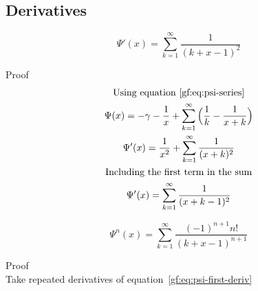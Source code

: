 \documentclass[a4paper]{article}
\begin{document}
    \subsection{Derivatives}\label{gf:subsec:derivatives}
    \begin{theorem}
        \begin{equation}
            \label{gf:eq:psi-first-deriv}
            \boxed{
                \Psi'(x) = \sum_{k=1}^{\infty} \frac{1}{(k+x-1)^2}
            }
        \end{equation}

        Proof
        \\
        \begin{gather*}
            \text{Using equation~\ref{gf:eq:psi-series}}
            \\
            \Psi(x) = -\gamma - \frac{1}{x} + \sum_{k=1}^{\infty} \Big( \frac{1}{k} - \frac{1}{x+k}  \Big)
            \\
            \Psi'(x) = \frac{1}{x^2} + \sum_{k=1}^{\infty} \frac{1}{(x+k)^2}
            \\
            \text{Including the first term in the sum}
            \\
            \Psi'(x) = \sum_{k=1}^{\infty} \frac{1}{(x+k - 1)^2}
        \end{gather*}
    \end{theorem}

    \begin{theorem}
        \begin{equation}
            \label{gf:eq:psi-nth-deriv}
            \boxed{
                \Psi^{n}(x) = \sum_{k=1}^{\infty} \frac{(-1)^{n+1} n! }{(k+x-1)^{n+1}}
            }
        \end{equation}

        Proof
        \\
        Take repeated derivatives of equation~\ref{gf:eq:psi-first-deriv}
    \end{theorem}
\end{document}
